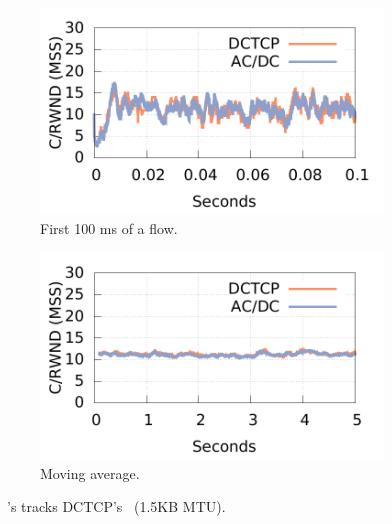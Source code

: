 \begin{figure}[!t]
        \centering
        \begin{subfigure}[b]{0.45\textwidth}
                \centering
                \includegraphics[width=\textwidth]{acdctcp/figures/cwnd_rwnd/newpara_refine/mtu1500_5flows_1/measure_cwnd_rwnd_gap_15k_5flows_0sec_100msec.pdf}
                \caption{First 100 ms of a flow.}
                \label{cwnd_rwnd_1500}
        \end{subfigure}
        \begin{subfigure}[b]{0.45\textwidth}
                \centering
                \includegraphics[width=\textwidth]{acdctcp/figures/cwnd_rwnd/moving-ave/measure_cwnd_rwnd_gap_15k_5flows_ave100.pdf}
                \caption{Moving average.}
                \label{cwnd_rwnd_1500_ave}
        \end{subfigure}

        \caption{~\acdc{}'s \rwnd{} tracks DCTCP's~\cwnd{} (1.5KB MTU).}
        \label{compare_cwnd_rwnd}
\end{figure}




